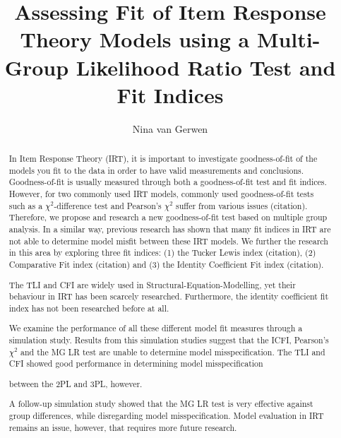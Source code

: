 \documentclass[Royal,sageapa,times,doublespace]{sagej}
\begin{document}

\title{Assessing Fit of Item Response Theory Models using a Multi-Group Likelihood Ratio Test and Fit Indices}

\author{Nina van Gerwen } %




\begin{abstract}
In Item Response Theory (IRT), it is important to investigate goodness-of-fit of the models you fit to the data in order to have valid measurements and conclusions. Goodness-of-fit is usually measured through both a goodness-of-fit test and fit indices. However, for two commonly used IRT models, commonly used goodness-of-fit tests such as a $\chi^2$-difference test and Pearson's $\chi^2$ suffer from various issues (citation). Therefore, we propose and research a new goodness-of-fit test based on multiple group analysis. In a similar way, previous research has shown that many fit indices in IRT are not able to determine model misfit between these IRT models. We further the research in this area by exploring three fit indices: (1) the Tucker Lewis index (citation), (2) Comparative Fit index (citation) and (3) the Identity Coefficient Fit index (citation). 

The TLI and CFI are widely used in Structural-Equation-Modelling, yet their behaviour in IRT has been scarcely researched. Furthermore, the identity coefficient fit index has not been researched before at all. 

We examine the performance of all these different model fit measures through a simulation study. Results from this simulation studies suggest that the ICFI, Pearson's $\chi^2$ and the MG LR test are unable to determine model misspecification. The TLI and CFI showed good performance in determining model misspecification 

between the 2PL and 3PL, however. 

A follow-up simulation study showed that the MG LR test is very effective against group differences, while disregarding model misspecification. Model evaluation in IRT remains an issue, however, that requires more future research. 

\end{abstract}
\end{document}
